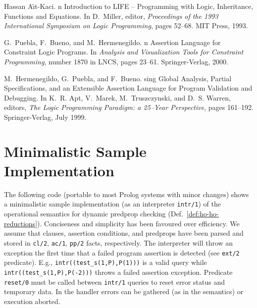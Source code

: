 \documentclass{llncs}
\begin{document}
\begin{thebibliography}{10}
Hassan A\"{\i}t-Kaci.
n {I}ntroduction to {LIFE} -- {P}rogramming with {L}ogic,
  {I}nheritance, {F}unctions and {E}quations.
\newblock In D.\ Miller, editor, {\em Proceedings of the 1993 International
  Symposium on Logic Programming}, pages 52--68. MIT Press, 1993.

G.~Puebla, F.~Bueno, and M.~Hermenegildo.
n {A}ssertion {L}anguage for {C}onstraint {L}ogic {P}rograms.
\newblock In {\em {A}nalysis and {V}isualization {T}ools for {C}onstraint
  {P}rogramming}, number 1870 in LNCS, pages 23--61. Springer-Verlag, 2000.

M.~Hermenegildo, G.~Puebla, and F.~Bueno.
sing {G}lobal {A}nalysis, {P}artial {S}pecifications, and an
  {E}xtensible {A}ssertion {L}anguage for {P}rogram {V}alidation and
  {D}ebugging.
\newblock In K.~R. Apt, V.~Marek, M.~Truszczynski, and D.~S. Warren, editors,
  {\em {T}he {L}ogic {P}rogramming {P}aradigm: a 25--{Y}ear {P}erspective},
  pages 161--192. Springer-Verlag, July 1999.

\end{thebibliography}
 

\appendix

\clearpage
\section{Minimalistic Sample Implementation}
\label{apx:implementation}

The following code (portable to most Prolog systems with minor
changes) shows a minimalistic sample implementation (as an interpreter
\texttt{intr/1}) of the operational semantics for dynamic predprop
checking (Def.~\ref{def:ho-ho-reductions}). Conciseness and simplicity
has been favoured over efficiency. We assume that clauses, assertion
conditions, and predprops have been parsed and stored in \texttt{cl/2},
\texttt{ac/1}, \texttt{pp/2} facts, respectively. The interpreter will  
throw an exception the first time that a failed program assertion is
detected (see \texttt{ext/2} predicate). E.g.,
\texttt{intr((test\_s(1,P),P(1)))} is a valid query while
\texttt{intr((test\_s(1,P),P(-2)))} throws a failed assertion
exception. Predicate \texttt{reset/0} must be called between
\texttt{intr/1} queries to reset error status and temporary
data. In the handler errors can be gathered (as in the semantics) or
execution aborted.
\end{document}
